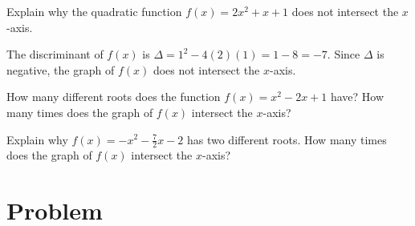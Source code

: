 \documentclass[a4paper,oneside,12pt]{article}
\begin{document}
\begin{example}
Explain why the quadratic function $f(x) = 2x^2 + x + 1$ does not
intersect the $x$-axis.
\end{example}

\begin{solution}
The discriminant of $f(x)$ is
$\Delta = 1^2 - 4(2)(1) = 1 - 8 = -7$.  Since $\Delta$ is negative,
the graph of $f(x)$ does not intersect the $x$-axis.
\end{solution}

\begin{exercise}
How many different roots does the function $f(x) = x^2 - 2x + 1$ have?
How many times does the graph of $f(x)$ intersect the $x$-axis?
\end{exercise}

\begin{exercise}
Explain why $f(x) = -x^2 - \frac{7}{2}x - 2$ has two different roots.
How many times does the graph of $f(x)$ intersect the $x$-axis?
\end{exercise}


\newpage

\section*{Problem}
\end{document}
